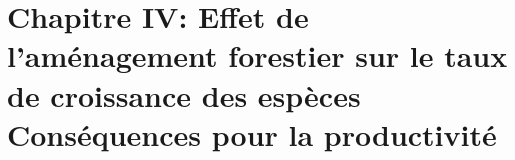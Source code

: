 \documentclass[11pt, compress, aspectratio=1610]{beamer}
\newcommand{\begincols}{\begin{columns}}
\begin{document}
\hypertarget{chapitre-iv-effet-de-lamuxe9nagement-forestier-sur-le-taux-de-croissance-des-espuxe8ces-consuxe9quences-pour-la-productivituxe9}{%
\section{\texorpdfstring{Chapitre IV: \newline Effet de l’aménagement
forestier sur le taux de croissance des espèces
\newline \large Conséquences pour la
productivité}{Chapitre IV: Effet de l’aménagement forestier sur le taux de croissance des espèces Conséquences pour la productivité}}\label{chapitre-iv-effet-de-lamuxe9nagement-forestier-sur-le-taux-de-croissance-des-espuxe8ces-consuxe9quences-pour-la-productivituxe9}}

\end{document}
